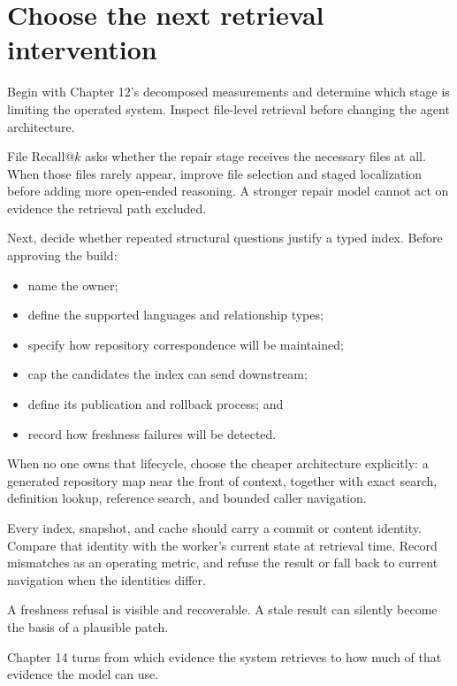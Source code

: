 \hypertarget{choose-the-next-retrieval-intervention}{%
\section{Choose the next retrieval intervention}\label{choose-the-next-retrieval-intervention}}

Begin with Chapter 12's decomposed measurements and determine which stage is limiting the operated system. Inspect file-level retrieval before changing the agent architecture.

File \(\mathrm{Recall}@k\) asks whether the repair stage receives the necessary files at all. When those files rarely appear, improve file selection and staged localization before adding more open-ended reasoning. A stronger repair model cannot act on evidence the retrieval path excluded.


Next, decide whether repeated structural questions justify a typed index. Before approving the build:

\begin{itemize}
\tightlist
\item
  name the owner;
\item
  define the supported languages and relationship types;
\item
  specify how repository correspondence will be maintained;
\item
  cap the candidates the index can send downstream;
\item
  define its publication and rollback process; and
\item
  record how freshness failures will be detected.
\end{itemize}

When no one owns that lifecycle, choose the cheaper architecture explicitly: a generated repository map near the front of context, together with exact search, definition lookup, reference search, and bounded caller navigation.

Every index, snapshot, and cache should carry a commit or content identity. Compare that identity with the worker's current state at retrieval time. Record mismatches as an operating metric, and refuse the result or fall back to current navigation when the identities differ.

A freshness refusal is visible and recoverable. A stale result can silently become the basis of a plausible patch.

Chapter 14 turns from which evidence the system retrieves to how much of that evidence the model can use.

